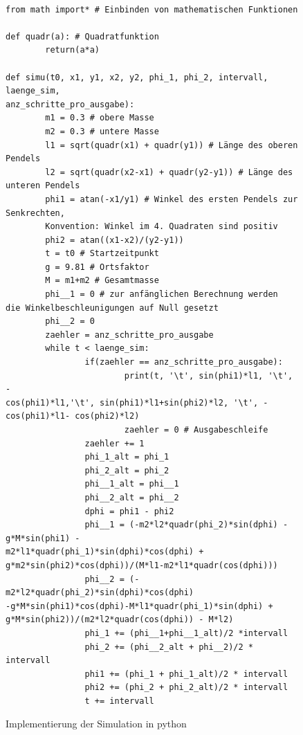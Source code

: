\begin{figure}
\begin{verbatim}

from math import* # Einbinden von mathematischen Funktionen

def quadr(a): # Quadratfunktion
        return(a*a)

def simu(t0, x1, y1, x2, y2, phi_1, phi_2, intervall, laenge_sim, 
anz_schritte_pro_ausgabe): 
        m1 = 0.3 # obere Masse
        m2 = 0.3 # untere Masse
        l1 = sqrt(quadr(x1) + quadr(y1)) # Länge des oberen Pendels
        l2 = sqrt(quadr(x2-x1) + quadr(y2-y1)) # Länge des unteren Pendels
        phi1 = atan(-x1/y1) # Winkel des ersten Pendels zur Senkrechten,
        Konvention: Winkel im 4. Quadraten sind positiv
        phi2 = atan((x1-x2)/(y2-y1))
        t = t0 # Startzeitpunkt
        g = 9.81 # Ortsfaktor
        M = m1+m2 # Gesamtmasse
        phi__1 = 0 # zur anfänglichen Berechnung werden 
die Winkelbeschleunigungen auf Null gesetzt
        phi__2 = 0
        zaehler = anz_schritte_pro_ausgabe
        while t < laenge_sim:
                if(zaehler == anz_schritte_pro_ausgabe):
                        print(t, '\t', sin(phi1)*l1, '\t', -
cos(phi1)*l1,'\t', sin(phi1)*l1+sin(phi2)*l2, '\t', -cos(phi1)*l1- cos(phi2)*l2)
                        zaehler = 0 # Ausgabeschleife
                zaehler += 1
                phi_1_alt = phi_1
                phi_2_alt = phi_2
                phi__1_alt = phi__1
                phi__2_alt = phi__2
                dphi = phi1 - phi2
                phi__1 = (-m2*l2*quadr(phi_2)*sin(dphi) - g*M*sin(phi1) -
m2*l1*quadr(phi_1)*sin(dphi)*cos(dphi) +
g*m2*sin(phi2)*cos(dphi))/(M*l1-m2*l1*quadr(cos(dphi)))
                phi__2 = (-m2*l2*quadr(phi_2)*sin(dphi)*cos(dphi)
-g*M*sin(phi1)*cos(dphi)-M*l1*quadr(phi_1)*sin(dphi) +
g*M*sin(phi2))/(m2*l2*quadr(cos(dphi)) - M*l2)
                phi_1 += (phi__1+phi__1_alt)/2 *intervall
                phi_2 += (phi__2_alt + phi__2)/2 * intervall
                phi1 += (phi_1 + phi_1_alt)/2 * intervall
                phi2 += (phi_2 + phi_2_alt)/2 * intervall
                t += intervall
\end{verbatim}
\label{code1}
\caption{Implementierung der Simulation in python}
\end{figure}

